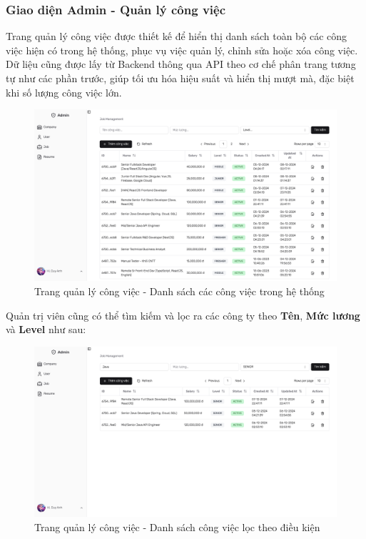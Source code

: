 \subsubsection{Giao diện Admin - Quản lý công việc}

Trang quản lý công việc được thiết kế để hiển thị danh sách toàn bộ các công việc hiện có trong hệ thống, phục vụ việc quản lý, chỉnh sửa hoặc xóa công việc. Dữ liệu cũng được lấy từ Backend thông qua API theo cơ chế phân trang tương tự như các phần trước, giúp tối ưu hóa hiệu suất và hiển thị mượt mà, đặc biệt khi số lượng công việc lớn.

\begin{figure}[H]
    \centering
    \includegraphics[width=\linewidth]{DBMS-Application/Images/admin-job.png}
    \caption{Trang quản lý công việc - Danh sách các công việc trong hệ thống}
    \label{fig:enter-label}
\end{figure}

Quản trị viên cũng có thể tìm kiếm và lọc ra các công ty theo \textbf{Tên}, \textbf{Mức lương} và \textbf{Level} như sau:

\begin{figure}[H]
    \centering
    \includegraphics[width=\linewidth]{DBMS-Application/Images/admin-job-filter.png}
    \caption{Trang quản lý công việc - Danh sách công việc lọc theo điều kiện}
    \label{fig:enter-label}
\end{figure}

